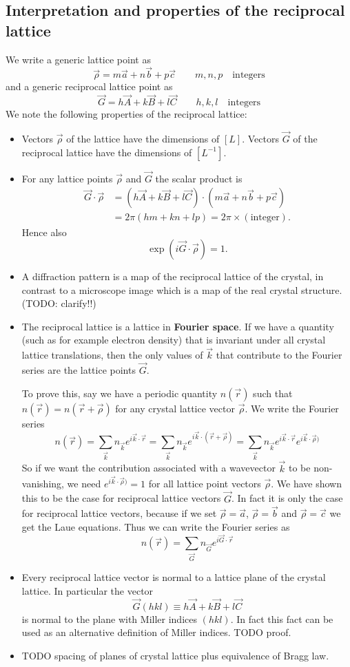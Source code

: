 \subsection{Interpretation and properties of the reciprocal lattice}
We write a generic lattice point as
\[ \vec{\rho} = m \vec{a} + n \vec{b} + p \vec{c} \qquad m, n, p \quad \text{integers} \]
and a generic reciprocal lattice point as
\[ \vec{G} = h \vec{A} + k \vec{B} + l \vec{C} \qquad h, k, l \quad \text{integers} \]
We note the following properties of the reciprocal lattice:
\begin{itemize}
\item Vectors $\vec{\rho}$ of the lattice have the dimensions of $[L]$. Vectors $\vec{G}$ of the reciprocal lattice have the dimensions of $[L^{-1}]$.
\item For any lattice points $\vec{\rho}$ and $\vec{G}$ the scalar product is
\begin{align*}
\vec{G}\cdot \vec{\rho} &= (h \vec{A} + k \vec{B} + l \vec{C})\cdot (m \vec{a} + n \vec{b} + p \vec{c}) \\
&= 2\pi (hm + kn  + lp) = 2\pi \times (\text{integer}).
\end{align*}
Hence also
\[ \exp(i \vec{G}\cdot \vec{\rho}) = 1. \]
\item A diffraction pattern is a map of the reciprocal lattice of the crystal, in contrast to a microscope image which is a map of the real crystal structure. (TODO: clarify!!)
\item The reciprocal lattice is a lattice in \textbf{Fourier space}. If we have a quantity (such as for example electron density) that is invariant under all crystal lattice translations, then the only values of $\vec{k}$ that contribute to the Fourier series are the lattice points $\vec{G}$.

To prove this, say we have a periodic quantity $n(\vec{r})$ such that $n(\vec{r}) = n(\vec{r}+\vec{\rho})$ for any crystal lattice vector $\vec{\rho}$. We write the Fourier series
\[ n(\vec{r}) = \sum_{\vec{k}} n_{\vec{k}}e^{i \vec{k}\cdot \vec{r}} = \sum_{\vec{k}} n_{\vec{k}}e^{i \vec{k}\cdot (\vec{r}+\vec{\rho})} = \sum_{\vec{k}} n_{\vec{k}}e^{i \vec{k}\cdot \vec{r}}e^{i\vec{k}\cdot\vec{\rho})} \]
So if we want the contribution associated with a wavevector $\vec{k}$ to be non-vanishing, we need $e^{i\vec{k}\cdot\vec{\rho})} = 1$ for all lattice point vectors $\vec{\rho}$. We have shown this to be the case for reciprocal lattice vectors $\vec{G}$. In fact it is only the case for reciprocal lattice vectors, because if we set $\vec{\rho} = \vec{a}$, $\vec{\rho} = \vec{b}$ and $\vec{\rho} = \vec{c}$ we get the Laue equations. Thus we can write the Fourier series as
\[ n(\vec{r}) = \sum_{\vec{G}} n_{\vec{G}}e^{i \vec{G}\cdot \vec{r}} \]
\item Every reciprocal lattice vector is normal to a lattice plane of the crystal lattice. In particular the vector
\[ \vec{G}(hkl) \equiv h \vec{A} + k \vec{B} + l \vec{C} \]
is normal to the plane with Miller indices $(hkl)$. In fact this fact can be used as an alternative definition of Miller indices. TODO proof.
\item TODO spacing of planes of crystal lattice plus equivalence of Bragg law.
\end{itemize}

